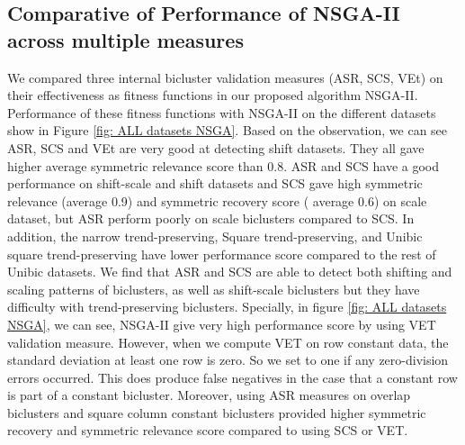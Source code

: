 \subsection{Comparative of Performance of NSGA-II across multiple measures}
We compared three internal bicluster validation measures (ASR, SCS, VEt) on their effectiveness as fitness functions in our proposed algorithm NSGA-II. Performance of these fitness functions with NSGA-II on the different datasets show in Figure \ref{fig: ALL datasets NSGA}.
Based on the observation, we can see ASR, SCS and VEt are very good at detecting shift datasets. They all gave higher average symmetric relevance score than 0.8. ASR and SCS have a good performance on shift-scale and shift datasets and SCS gave high symmetric relevance (average 0.9) and symmetric recovery score ( average 0.6) on scale dataset, but ASR perform poorly on scale biclusters compared to SCS. In addition, the narrow trend-preserving, Square trend-preserving, and Unibic square trend-preserving have lower performance score compared to the rest of Unibic datasets. We find that ASR and SCS are able to detect both shifting and scaling patterns of biclusters, as well as shift-scale biclusters but they have difficulty with trend-preserving biclusters.
Specially, in figure \ref{fig: ALL datasets NSGA}, we can see, NSGA-II give very high performance score by using VET validation measure. However, when we compute VET on row constant data, the standard deviation at least one row is zero. So we set to one if any zero-division errors occurred. This does produce false negatives in the case that a constant row is part of a constant bicluster. Moreover, using ASR measures on overlap biclusters and square column constant biclusters provided higher symmetric recovery and symmetric relevance score compared to using SCS or VET.

